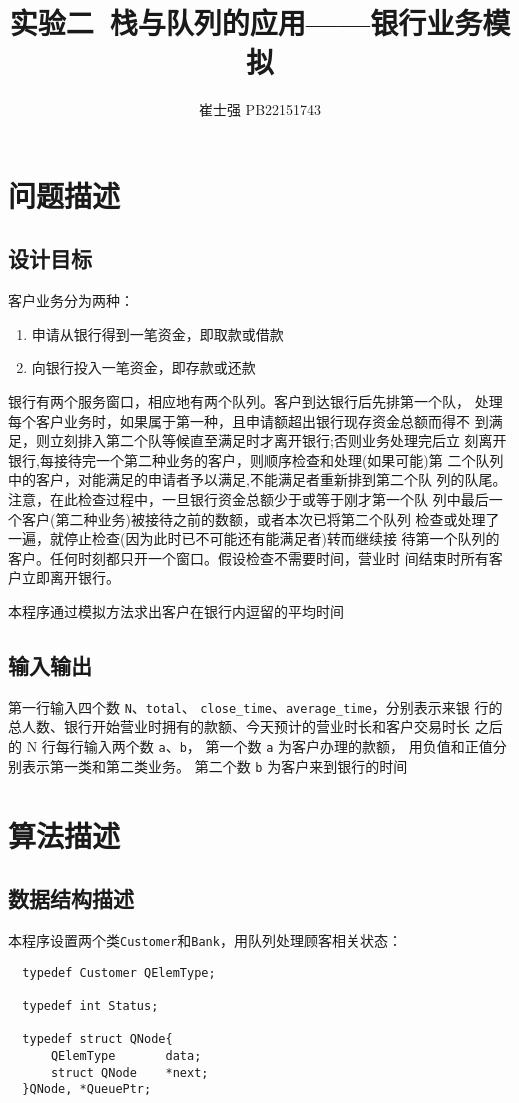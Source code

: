 \documentclass[UTF8]{ctexart}
\title{实验二\ 栈与队列的应用——银行业务模拟}
\author{崔士强 PB22151743}
\date{}
\begin{document}
\maketitle

\section{问题描述}
\subsection{设计目标}
客户业务分为两种：
\begin{enumerate}
  \item 申请从银行得到一笔资金，即取款或借款
  \item 向银行投入一笔资金，即存款或还款
\end{enumerate}

银行有两个服务窗口，相应地有两个队列。客户到达银行后先排第一个队，
处理每个客户业务时，如果属于第一种，且申请额超出银行现存资金总额而得不
到满足，则立刻排入第二个队等候直至满足时才离开银行;否则业务处理完后立
刻离开银行,每接待完一个第二种业务的客户，则顺序检查和处理(如果可能)第
二个队列中的客户，对能满足的申请者予以满足,不能满足者重新排到第二个队
列的队尾。注意，在此检查过程中，一旦银行资金总额少于或等于刚才第一个队
列中最后一个客户(第二种业务)被接待之前的数额，或者本次已将第二个队列
检查或处理了一遍，就停止检查(因为此时已不可能还有能满足者)转而继续接
待第一个队列的客户。任何时刻都只开一个窗口。假设检查不需要时间，营业时
间结束时所有客户立即离开银行。

本程序通过模拟方法求出客户在银行内逗留的平均时间
\subsection{输入输出}
第一行输入四个数 \lstinline{N}、\lstinline{total}、
\lstinline{close_time}、\lstinline{average_time}，分别表示来银
行的总人数、银行开始营业时拥有的款额、今天预计的营业时长和客户交易时长
之后的 N 行每行输入两个数 \lstinline{a}、\lstinline{b}，
第一个数 \lstinline{a} 为客户办理的款额，
用负值和正值分别表示第一类和第二类业务。
第二个数 \lstinline{b} 为客户来到银行的时间
\section{算法描述}
\subsection{数据结构描述}
本程序设置两个类\lstinline{Customer}和\lstinline{Bank}，用队列处理顾客相关状态：
\begin{lstlisting}
  typedef Customer QElemType;

  typedef int Status;
  
  typedef struct QNode{
      QElemType       data;
      struct QNode    *next;
  }QNode, *QueuePtr;
\end{lstlisting}
\end{document}
